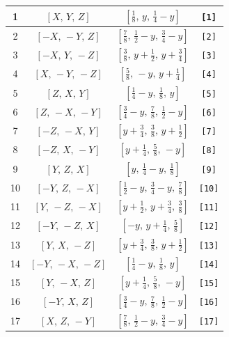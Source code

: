 \documentclass[fleqn,8pt]{jsarticle}
\begin{document}
\begin{longtable}{cccc}
1 & $\left[ X,\, Y,\, Z \right]$ & $\left[ \frac{1}{8},\, y,\, \frac{1}{4} - y \right]$ & {\tt [1]} \\ \hline
2 & $\left[ - X,\, - Y,\, Z \right]$ & $\left[ \frac{7}{8},\, \frac{1}{2} - y,\, \frac{3}{4} - y \right]$ & {\tt [2]} \\ \hline
3 & $\left[ - X,\, Y,\, - Z \right]$ & $\left[ \frac{3}{8},\, y + \frac{1}{2},\, y + \frac{3}{4} \right]$ & {\tt [3]} \\ \hline
4 & $\left[ X,\, - Y,\, - Z \right]$ & $\left[ \frac{5}{8},\, - y,\, y + \frac{1}{4} \right]$ & {\tt [4]} \\ \hline
5 & $\left[ Z,\, X,\, Y \right]$ & $\left[ \frac{1}{4} - y,\, \frac{1}{8},\, y \right]$ & {\tt [5]} \\ \hline
6 & $\left[ Z,\, - X,\, - Y \right]$ & $\left[ \frac{3}{4} - y,\, \frac{7}{8},\, \frac{1}{2} - y \right]$ & {\tt [6]} \\ \hline
7 & $\left[ - Z,\, - X,\, Y \right]$ & $\left[ y + \frac{3}{4},\, \frac{3}{8},\, y + \frac{1}{2} \right]$ & {\tt [7]} \\ \hline
8 & $\left[ - Z,\, X,\, - Y \right]$ & $\left[ y + \frac{1}{4},\, \frac{5}{8},\, - y \right]$ & {\tt [8]} \\ \hline
9 & $\left[ Y,\, Z,\, X \right]$ & $\left[ y,\, \frac{1}{4} - y,\, \frac{1}{8} \right]$ & {\tt [9]} \\ \hline
10 & $\left[ - Y,\, Z,\, - X \right]$ & $\left[ \frac{1}{2} - y,\, \frac{3}{4} - y,\, \frac{7}{8} \right]$ & {\tt [10]} \\ \hline
11 & $\left[ Y,\, - Z,\, - X \right]$ & $\left[ y + \frac{1}{2},\, y + \frac{3}{4},\, \frac{3}{8} \right]$ & {\tt [11]} \\ \hline
12 & $\left[ - Y,\, - Z,\, X \right]$ & $\left[ - y,\, y + \frac{1}{4},\, \frac{5}{8} \right]$ & {\tt [12]} \\ \hline
13 & $\left[ Y,\, X,\, - Z \right]$ & $\left[ y + \frac{3}{4},\, \frac{3}{8},\, y + \frac{1}{2} \right]$ & {\tt [13]} \\ \hline
14 & $\left[ - Y,\, - X,\, - Z \right]$ & $\left[ \frac{1}{4} - y,\, \frac{1}{8},\, y \right]$ & {\tt [14]} \\ \hline
15 & $\left[ Y,\, - X,\, Z \right]$ & $\left[ y + \frac{1}{4},\, \frac{5}{8},\, - y \right]$ & {\tt [15]} \\ \hline
16 & $\left[ - Y,\, X,\, Z \right]$ & $\left[ \frac{3}{4} - y,\, \frac{7}{8},\, \frac{1}{2} - y \right]$ & {\tt [16]} \\ \hline
17 & $\left[ X,\, Z,\, - Y \right]$ & $\left[ \frac{7}{8},\, \frac{1}{2} - y,\, \frac{3}{4} - y \right]$ & {\tt [17]} \\ \hline

\end{longtable}
\end{document}
